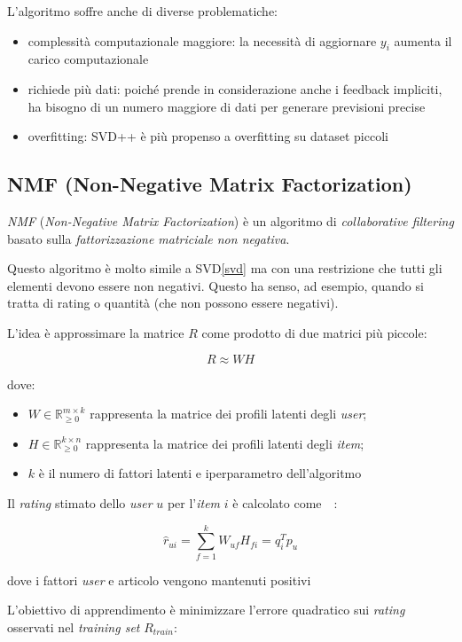 L'algoritmo soffre anche di diverse problematiche:

\begin{itemize}
    \item complessità computazionale maggiore: la necessità di aggiornare $y_i$ aumenta il carico computazionale
    \item richiede più dati: poiché prende in considerazione anche i feedback impliciti, ha bisogno di un numero maggiore di dati per generare previsioni precise
    \item overfitting: SVD++ è più propenso a overfitting su dataset piccoli
\end{itemize}

\subsection{NMF (Non-Negative Matrix Factorization)}\label{nmf}

\textit{NMF} (\textit{Non-Negative Matrix Factorization}) è un algoritmo di \textit{collaborative filtering} basato sulla \textit{fattorizzazione matriciale non negativa}.  

Questo algoritmo è molto simile a SVD\ref{svd} ma con una restrizione che tutti gli elementi devono essere non negativi. Questo ha senso, ad esempio, quando si tratta di rating o quantità (che non possono essere negativi).

L'idea è approssimare la matrice $R$ come prodotto di due matrici più piccole:

\[
R \approx WH
\]

dove:
\begin{itemize}
    \item $W \in \mathbb{R}_{\geq 0}^{m \times k}$ rappresenta la matrice dei profili latenti degli \textit{user};
    \item $H \in \mathbb{R}_{\geq 0}^{k \times n}$ rappresenta la matrice dei profili latenti degli \textit{item};
    \item $k$ è il numero di fattori latenti e iperparametro dell'algoritmo
\end{itemize}

Il \textit{rating} stimato dello \textit{user} $u$ per l'\textit{item} $i$ è calcolato come~\cite{NMF2}~\cite{NMF3}:

\[
\hat{r}_{ui} = \sum_{f=1}^k W_{uf} H_{fi} = q_i^T p_u
\]

dove i fattori \textit{user} e articolo vengono mantenuti positivi

L'obiettivo di apprendimento è minimizzare l'errore quadratico sui \textit{rating} osservati nel \textit{training set} $R_{train}$:

